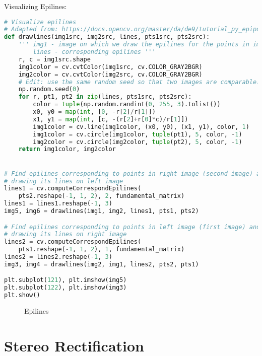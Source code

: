 Visualizing Epilines:

\begin{center}{\begin{minipage}{0.9\linewidth}
\begin{lstlisting}[language=Python, basicstyle=\fontsize{8}{10}\selectfont\ttfamily]
# Visualize epilines
# Adapted from: https://docs.opencv.org/master/da/de9/tutorial_py_epipolar_geometry.html
def drawlines(img1src, img2src, lines, pts1src, pts2src):
    ''' img1 - image on which we draw the epilines for the points in img2
        lines - corresponding epilines '''
    r, c = img1src.shape
    img1color = cv.cvtColor(img1src, cv.COLOR_GRAY2BGR)
    img2color = cv.cvtColor(img2src, cv.COLOR_GRAY2BGR)
    # Edit: use the same random seed so that two images are comparable!
    np.random.seed(0)
    for r, pt1, pt2 in zip(lines, pts1src, pts2src):
        color = tuple(np.random.randint(0, 255, 3).tolist())
        x0, y0 = map(int, [0, -r[2]/r[1]])
        x1, y1 = map(int, [c, -(r[2]+r[0]*c)/r[1]])
        img1color = cv.line(img1color, (x0, y0), (x1, y1), color, 1)
        img1color = cv.circle(img1color, tuple(pt1), 5, color, -1)
        img2color = cv.circle(img2color, tuple(pt2), 5, color, -1)
    return img1color, img2color


# Find epilines corresponding to points in right image (second image) and
# drawing its lines on left image
lines1 = cv.computeCorrespondEpilines(
    pts2.reshape(-1, 1, 2), 2, fundamental_matrix)
lines1 = lines1.reshape(-1, 3)
img5, img6 = drawlines(img1, img2, lines1, pts1, pts2)

# Find epilines corresponding to points in left image (first image) and
# drawing its lines on right image
lines2 = cv.computeCorrespondEpilines(
    pts1.reshape(-1, 1, 2), 1, fundamental_matrix)
lines2 = lines2.reshape(-1, 3)
img3, img4 = drawlines(img2, img1, lines2, pts2, pts1)

plt.subplot(121), plt.imshow(img5)
plt.subplot(122), plt.imshow(img3)
plt.show()
\end{lstlisting}
\end{minipage}}\end{center}

\begin{figure}[H]
\centering
\subfloat{\texttt{[image: 4]}}
\caption{Epilines}
\end{figure}

\section*{Stereo Rectification}

